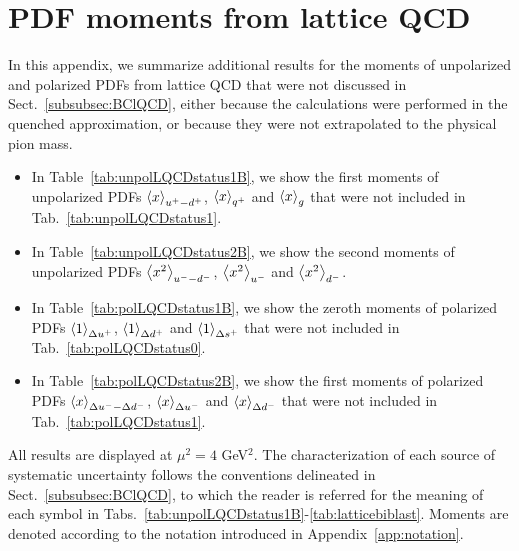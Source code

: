 \section{PDF moments from lattice QCD}
\label{sec:LQCDtables}

In this appendix, we summarize additional results for the moments of 
unpolarized and polarized PDFs from lattice QCD that were not discussed in 
Sect.~\ref{subsubsec:BClQCD}, either because the calculations were 
performed in the quenched approximation, or because they were not extrapolated
to the physical pion mass.

\begin{itemize}

\item In Table~\ref{tab:unpolLQCDstatus1B}, we show the first moments of 
unpolarized PDFs $\left\langle x\right\rangle_{u^+-d^+}$, $\left\langle x\right\rangle_{q^+}$ and $\left\langle x\right\rangle_g$
that were not included in Tab.~\ref{tab:unpolLQCDstatus1}.

\item In Table~\ref{tab:unpolLQCDstatus2B}, we show the second moments of 
unpolarized PDFs $\left\langle x^2\right\rangle_{u^--d^-}$, $\left\langle x^2\right\rangle_{u^-}$ and $\left\langle x^2\right\rangle_{d^-}$.

\item In Table~\ref{tab:polLQCDstatus1B}, we show the zeroth moments of 
polarized PDFs $\left\langle 1\right\rangle_{\Delta u^+}$, $\left\langle 1\right\rangle_{\Delta d^+}$ and 
$\left\langle 1\right\rangle_{\Delta s^+}$ that were not included in Tab.~\ref{tab:polLQCDstatus0}.

\item In Table~\ref{tab:polLQCDstatus2B}, we show the first moments of 
polarized PDFs $\left\langle x\right\rangle_{\Delta u^--\Delta d^-}$, $\left\langle x\right\rangle_{\Delta u^-}$ and  
$\left\langle x\right\rangle_{\Delta d^-}$ that were not included in Tab.~\ref{tab:polLQCDstatus1}.

\end{itemize}
%
All results are displayed at $\mu^2=4$ GeV$^2$.
%
The characterization of each source of systematic uncertainty follows the
conventions delineated in Sect.~\ref{subsubsec:BClQCD}, to which the reader 
is referred for the meaning of each symbol in 
Tabs.~\ref{tab:unpolLQCDstatus1B}-\ref{tab:latticebiblast}.
%
Moments are denoted according to the notation introduced in 
Appendix~\ref{app:notation}.

